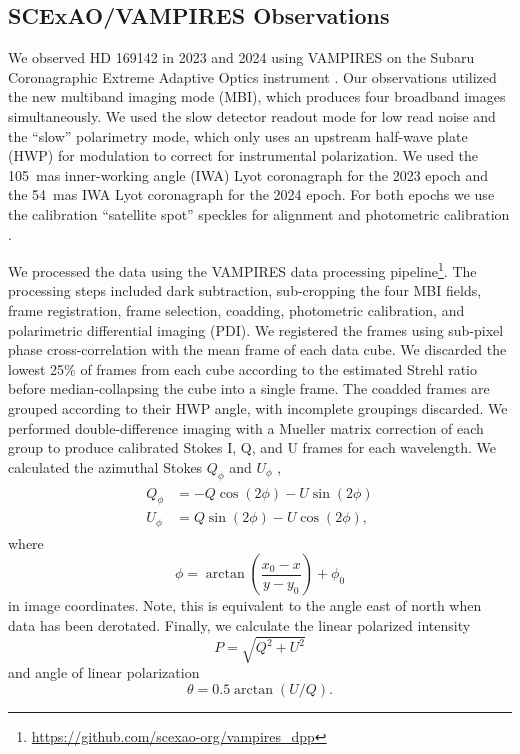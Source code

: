 \subsection{SCExAO/VAMPIRES Observations\label{sec:obs_vampires}}

We observed HD 169142 in 2023 and 2024 using VAMPIRES \citep{norris_vampires_2015,lucas_visible-light_2024-1} on the Subaru Coronagraphic Extreme Adaptive Optics instrument \citep{jovanovic_subaru_2015}. Our observations utilized the new multiband imaging mode (MBI), which produces four broadband images simultaneously. We used the slow detector readout mode for low read noise and the ``slow'' polarimetry mode, which only uses an upstream half-wave plate (HWP) for modulation to correct for instrumental polarization. We used the \SI{105}{mas} inner-working angle (IWA) Lyot coronagraph for the 2023 epoch and the \SI{54}{mas} IWA Lyot coronagraph for the 2024 epoch. For both epochs we use the calibration ``satellite spot'' speckles for alignment and photometric calibration \citep{sahoo_precision_2020}.

We processed the data using the VAMPIRES data processing pipeline\footnote{\url{https://github.com/scexao-org/vampires_dpp}}. The processing steps included dark subtraction, sub-cropping the four MBI fields, frame registration, frame selection, coadding, photometric calibration, and polarimetric differential imaging (PDI). We registered the frames using sub-pixel phase cross-correlation \citep{guizar-sicairos_efficient_2008} with the mean frame of each data cube. We discarded the lowest 25\% of frames from each cube according to the estimated Strehl ratio before median-collapsing the cube into a single frame. The coadded frames are grouped according to their HWP angle, with incomplete groupings discarded. We performed double-difference imaging with a Mueller matrix correction of each group to produce calibrated Stokes I, Q, and U frames for each wavelength. We calculated the azimuthal Stokes $Q_\phi$ and $U_\phi$ \citep{schmid_limb_2006,monnier_multiple_2019},
\begin{align}
\begin{split}
    \label{eqn:az_stokes}
    Q_\phi &= -Q\cos{\left(2\phi\right)} - U\sin{\left(2\phi\right)} \\
    U_\phi &= Q\sin{\left(2\phi\right)} - U\cos{\left(2\phi\right)},
\end{split}
\end{align}
where
\begin{equation}
    \phi = \arctan{\left( \frac{x_0 - x}{y - y_0} \right)} + \phi_0
\end{equation}
in image coordinates. Note, this is equivalent to the angle east of north when data has been derotated.
Finally, we calculate the linear polarized intensity
\begin{equation}
    P = \sqrt{Q^2 + U^2}
\end{equation}
and angle of linear polarization
\begin{equation}
    \theta = 0.5\arctan{\left(U / Q \right)}.
\end{equation}

